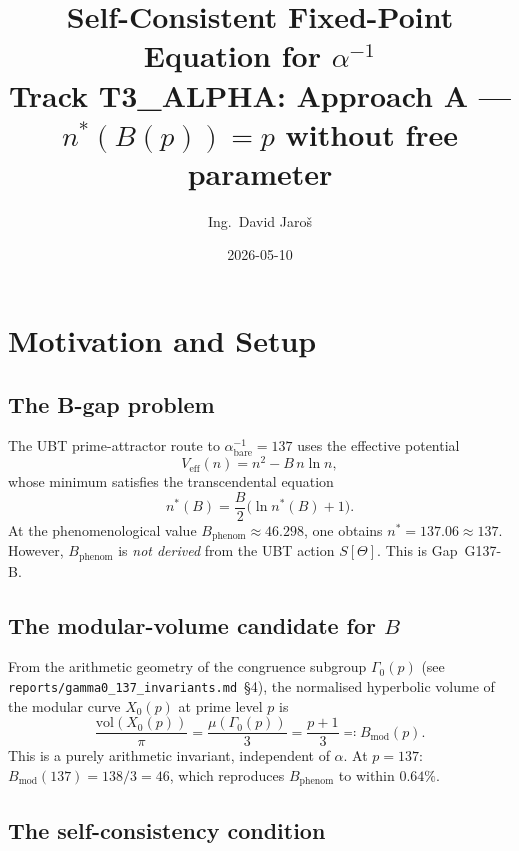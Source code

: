 \documentclass[12pt,a4paper]{article}
\title{\textbf{Self-Consistent Fixed-Point Equation for $\alpha^{-1}$}\\[4pt]
         \large Track T3\_ALPHA: Approach A --- $n^*(B(p)) = p$ without free parameter}
\author{Ing.\ David Jaro\v{s}}
\date{2026-05-10}
\theoremstyle{definition}
\theoremstyle{remark}
\newcommand{\Veff}{V_{\mathrm{eff}}}
\begin{document}
  \maketitle
\fi

\section{Motivation and Setup}
\label{sec:sc:motivation}

\subsection{The B-gap problem}

The UBT prime-attractor route to $\alpha^{-1}_{\mathrm{bare}} = 137$ uses the
effective potential
\begin{equation}
  \Veff(n) = n^2 - B\,n\ln n ,
  \label{eq:Veff}
\end{equation}
whose minimum satisfies the transcendental equation
\begin{equation}
  n^*(B) = \frac{B}{2}\bigl(\ln n^*(B) + 1\bigr) .
  \label{eq:nstar_transcendental}
\end{equation}
At the phenomenological value $B_{\mathrm{phenom}} \approx 46.298$, one obtains
$n^* = 137.06 \approx 137$.  However, $B_{\mathrm{phenom}}$ is \emph{not
derived} from the UBT action $S[\Theta]$.  This is Gap~G137-B.

\subsection{The modular-volume candidate for $B$}

From the arithmetic geometry of the congruence subgroup $\Gamma_0(p)$
(see \texttt{reports/gamma0\_137\_invariants.md}~\S{}4), the normalised
hyperbolic volume of the modular curve $X_0(p)$ at prime level $p$ is
\begin{equation}
  \frac{\mathrm{vol}(X_0(p))}{\pi}
  = \frac{\mu(\Gamma_0(p))}{3}
  = \frac{p+1}{3}
  \eqqcolon B_{\mathrm{mod}}(p) .
  \label{eq:Bmod}
\end{equation}
This is a purely arithmetic invariant, independent of $\alpha$.  At $p = 137$:
$B_{\mathrm{mod}}(137) = 138/3 = 46$, which reproduces $B_{\mathrm{phenom}}$
to within $0.64\%$.

\subsection{The self-consistency condition}
\end{document}

